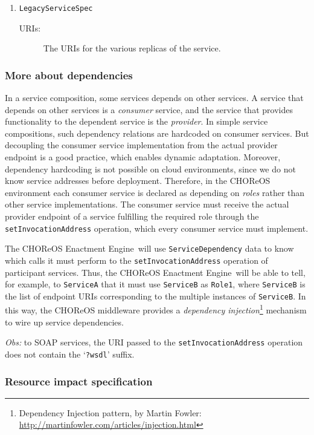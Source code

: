 \documentclass[a4paper, 10pt]{article}
\newcommand{\ee}{CHOReOS Enactment Engine}
\begin{document}
\begin{enumerate}
\item \verb!LegacyServiceSpec!
	\begin{description}
		\item [URIs:] The URIs for the various replicas of the service.
	\end{description}

\end{enumerate}

\subsubsection*{More about dependencies}

In a service composition, some services depends on other services. A service that depends on other services is a \emph{consumer} service, and the service that provides functionality to the dependent service is the \emph{provider}. In simple service compositions, such dependency relations are hardcoded on consumer services. But decoupling the consumer service implementation from the actual provider endpoint is a good practice, which enables dynamic adaptation. Moreover, dependency hardcoding is not possible on cloud environments, since we do not know service addresses before deployment. Therefore, in the CHOReOS environment each consumer service is declared as depending on \emph{roles} rather than other service implementations. The consumer service must receive the actual provider endpoint of a service fulfilling the required role through the \verb!setInvocationAddress! operation, which every consumer service must implement.  

The \ee\ will use \verb!ServiceDependency! data to know which calls it must perform to the  \verb!setInvocationAddress! operation of participant services. Thus, the \ee\ will be able to tell, for example, to \verb!ServiceA! that it must use \verb!ServiceB! as \verb!Role1!, where \verb!ServiceB! is the list of endpoint URIs corresponding to the multiple instances of \verb!ServiceB!. In this way, the CHOReOS middleware provides a \emph{dependency injection}\footnote{Dependency Injection pattern, by Martin Fowler: \url{http://martinfowler.com/articles/injection.html}} mechanism to wire up service dependencies.

\emph{Obs:} to SOAP services, the URI passed to the \texttt{setInvocationAddress} operation does not contain the `\texttt{?wsdl}' suffix.

\subsubsection*{Resource impact specification}
\end{document}
